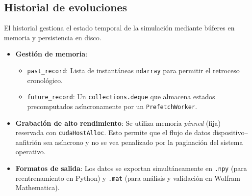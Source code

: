 \subsection{Historial de evoluciones}

El historial gestiona el estado temporal de la simulación mediante búferes en memoria y persistencia en disco.

\begin{itemize}
	\item \textbf{Gestión de memoria}: 
	\begin{itemize}
		\item \texttt{past\_record}: Lista de instantáneas \texttt{ndarray} para permitir el retroceso cronológico.
		\item \texttt{future\_record}: Un \texttt{collections.deque} que almacena estados precomputados asíncronamente por un \texttt{PrefetchWorker}.
	\end{itemize}
	
	\item \textbf{Grabación de alto rendimiento}: Se utiliza memoria \textit{pinned} (fija) reservada con \texttt{cudaHostAlloc}. Esto permite que el flujo de datos dispositivo--anfitrión sea asíncrono y no se vea penalizado por la paginación del sistema operativo.
	
	\item \textbf{Formatos de salida}: Los datos se exportan simultáneamente en \texttt{.npy} (para reentrenamiento en Python) y \texttt{.mat} (para análisis y validación en Wolfram Mathematica).
\end{itemize}